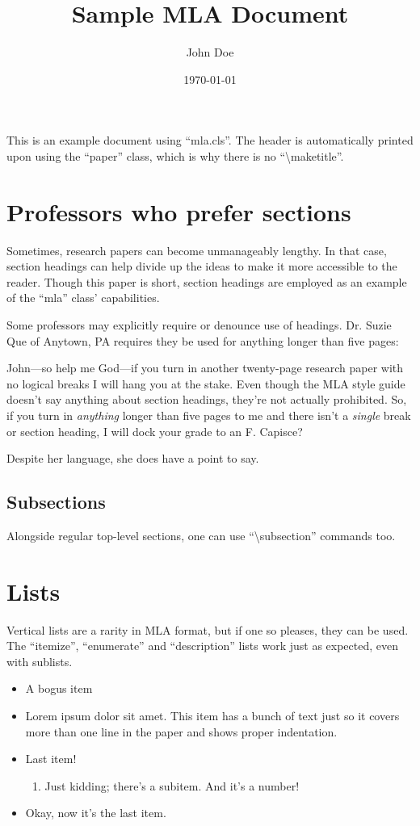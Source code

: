 \documentclass[mla8]{mla}
\title{Sample MLA Document}
\author{John Doe}
\date{\today}
\begin{document}
\begin{paper}

This is an example document using ``mla.cls''.
The header is automatically printed upon using the ``paper'' class,
which is why there is no ``\textbackslash{}maketitle''.

\section{Professors who prefer sections}

Sometimes, research papers can become unmanageably lengthy.
In that case, section headings can help divide up the ideas
to make it more accessible to the reader.
Though this paper is short, section headings are employed
as an example of the ``mla'' class' capabilities.

Some professors may explicitly require or denounce use of headings.
Dr. Suzie Que of Anytown, PA requires they be used for anything
longer than five pages:
\begin{blockquote}
John---so help me God---if you turn in another twenty-page research
paper with no logical breaks I will hang you at the stake.
Even though the MLA style guide doesn't say anything about
section headings, they're not actually prohibited.
So, if you turn in \emph{anything} longer than five pages to me
and there isn't a \emph{single} break or section heading,
I will dock your grade to an F.
Capisce? \cite{que2019}
\end{blockquote}
Despite her language, she does have a point to say.

\subsection{Subsections}

Alongside regular top-level sections, one can use
``\textbackslash{}subsection'' commands too.

\section{Lists}

Vertical lists are a rarity in MLA format, but if one so pleases,
they can be used.
The ``itemize'', ``enumerate'' and ``description'' lists
work just as expected, even with sublists.

\begin{itemize}
\item A bogus item
\item Lorem ipsum dolor sit amet.  This item has a bunch of text
	just so it covers more than one line in the paper and shows
	proper indentation.
\item Last item!
\begin{enumerate}
\item Just kidding; there's a subitem.  And it's a number!
\end{enumerate}
\item Okay, now it's the last item.
\end{itemize}


\end{paper}
\end{document}
